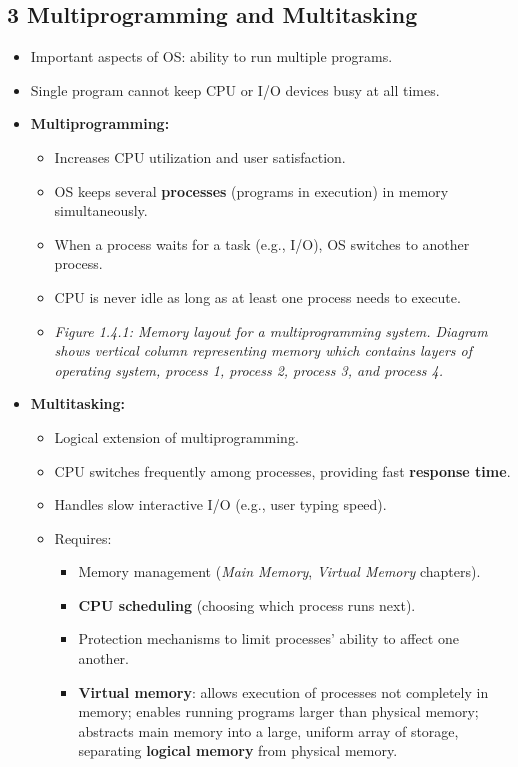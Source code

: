 \documentclass{article}
\begin{document}
\subsection*{3 Multiprogramming and Multitasking}
\begin{itemize}
    \item Important aspects of OS: ability to run multiple programs.
    \item Single program cannot keep CPU or I/O devices busy at all times.
\item \textbf{Multiprogramming:}
    \begin{itemize}
        \item Increases CPU utilization and user satisfaction.
        \item OS keeps several \textbf{processes} (programs in execution) in memory simultaneously.
        \item When a process waits for a task (e.g., I/O), OS switches to another process.
        \item CPU is never idle as long as at least one process needs to execute.
        \item \textit{Figure 1.4.1: Memory layout for a multiprogramming system. Diagram shows vertical column representing memory which contains layers of operating system, process 1, process 2, process 3, and process 4.}
    \end{itemize}
\item \textbf{Multitasking:}
    \begin{itemize}
        \item Logical extension of multiprogramming.
        \item CPU switches frequently among processes, providing fast \textbf{response time}.
        \item Handles slow interactive I/O (e.g., user typing speed).
        \item Requires:
        \begin{itemize}
            \item Memory management (\textit{Main Memory}, \textit{Virtual Memory} chapters).
            \item \textbf{CPU scheduling} (choosing which process runs next).
            \item Protection mechanisms to limit processes' ability to affect one another.
            \item \textbf{Virtual memory}: allows execution of processes not completely in memory; enables running programs larger than physical memory; abstracts main memory into a large, uniform array of storage, separating \textbf{logical memory} from physical memory.

\end{itemize}
\end{itemize}
\end{itemize}
\end{document}
